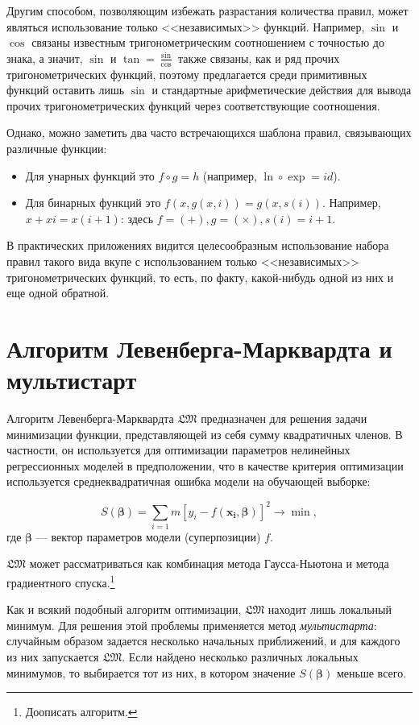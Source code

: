 \documentclass[12pt,a4paper]{amsart}
\begin{document}
Другим способом, позволяющим избежать разрастания количества правил, может
являться использование только <<независимых>> функций. Например, $\sin$ и
$\cos$ связаны известным тригонометрическим соотношением с точностью до знака,
а значит, $\sin$ и $\tan = \frac{\sin}{\cos}$ также связаны, как и ряд прочих
тригонометрических функций, поэтому предлагается среди примитивных функций
оставить лишь $\sin$ и стандартные арифметические действия для вывода прочих
тригонометрических функций через соответствующие соотношения.

Однако, можно заметить два часто встречающихся шаблона правил, связывающих
различные функции:
\begin{itemize}
  \item Для унарных функций это $f \circ g = h$ (например,
	$\ln \circ \exp = id$).
  \item Для бинарных функций это $ f (x, g (x, i)) = g (x, s (i)) $.
	Например, $x + xi = x(i+1)$: здесь $f = (+), g = (\times), s(i) = i + 1$.
\end{itemize}

В практических приложениях видится целесообразным использование набора правил
такого вида вкупе с использованием только <<независимых>> тригонометрических
функций, то есть, по факту, какой-нибудь одной из них и еще одной обратной.

\section{Алгоритм Левенберга-Марквардта и мультистарт}

Алгоритм Левенберга-Марквардта $\mathfrak{LM}$ предназначен для решения
задачи минимизации функции, представляющей из себя сумму квадратичных членов.
В частности, он используется для оптимизации параметров нелинейных регрессионных
моделей в предположении, что в качестве критерия оптимизации используется
среднеквадратичная ошибка модели на обучающей выборке:

\[
S(\mathbf{\beta}) = \sum_{i=1}{m} [y_i - f(\mathbf{x_i}, \mathbf{\beta})]^2 \to \min,
\]
где $\mathbf{\beta}$ --- вектор параметров модели (суперпозиции) $f$.

$\mathfrak{LM}$ может рассматриваться как комбинация метода Гаусса-Ньютона и
метода градиентного спуска.\footnote{Доописать алгоритм.}

Как и всякий подобный алгоритм оптимизации, $\mathfrak{LM}$ находит лишь
локальный минимум. Для решения этой проблемы применяется метод \emph{мультистарта}:
случайным образом задается несколько начальных приближений, и для каждого из
них запускается $\mathfrak{LM}$. Если найдено несколько различных локальных
минимумов, то выбирается тот из них, в котором значение $S(\mathbf{\beta})$
меньше всего.
\end{document}
